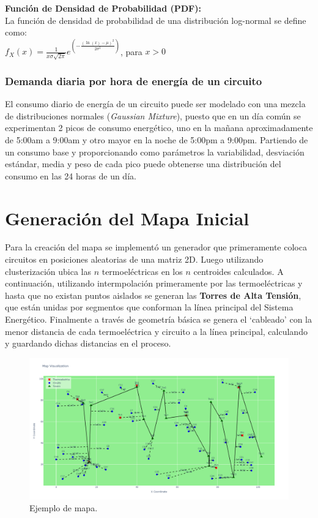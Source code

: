 \documentclass[twocolumn, fontsize=10pt]{article}
\begin{document}
\textbf{Función de Densidad de Probabilidad (PDF):}\\
La función de densidad de probabilidad de una distribución log-normal se define como:\\
$ f_X(x) = \frac{1}{x \sigma \sqrt{2 \pi}} e^{\left(-\frac{(\ln(x) - \mu)^2}{2 \sigma^2}\right)} $,  para $x > 0$

\subsubsection{Demanda diaria por hora de energía de un circuito}
El consumo diario de energía de un circuito puede ser modelado con una mezcla de distribuciones 
normales (\textit{Gaussian Mixture}), puesto que en un día común se experimentan 2 picos de consumo 
energético, uno en la mañana aproximadamente de 5:00am a 9:00am y otro mayor en la noche de 5:00pm 
a 9:00pm.
Partiendo de un consumo base y proporcionando como parámetros la variabilidad, desviación estándar, media y peso de cada pico puede obtenerse una distribución del consumo en las 24 horas de un día.\\


\section{Generación del Mapa Inicial}

Para la creación del mapa se implementó un generador que primeramente coloca circuitos en posiciones aleatorias 
de una matriz 2D. Luego utilizando clusterización ubica las $n$ termoeléctricas en los $n$ centroides calculados.
A continuación, utilizando intermpolación primeramente por las termoeléctricas y hasta que no existan puntos aislados se generan las 
\textbf{Torres de Alta Tensión}, que están unidas por segmentos que conforman la línea principal del Sistema Energético. 
Finalmente a través de geometría básica se genera el `cableado' con la menor distancia de cada termoeléctrica y circuito a la línea principal, calculando y guardando dichas distancias en el proceso.

\begin{figure}[H]
  \centering
  \includegraphics[width=\columnwidth]{assets/map_example.png}
  \caption{Ejemplo de mapa.}
  \label{fig:ejemplo}
\end{figure}
\end{document}
